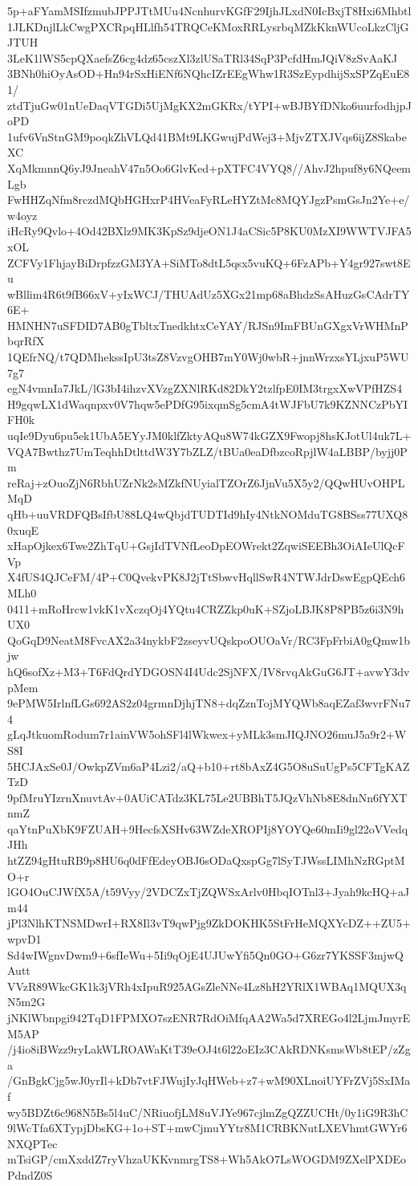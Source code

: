 5p+aFYamMSIfzmubJPPJTtMUu4NcnhurvKGfF29IjhJLxdN0IcBxjT8Hxi6Mhbtl
1JLKDnjlLkCwgPXCRpqHLlfh54TRQCeKMoxRRLysrbqMZkKknWUcoLkzCljGJTUH
3LeK1lWS5cpQXaefsZ6cg4dz65cszXl3zlUSaTRl34SqP3PcfdHmJQiV8zSvAaKJ
3BNh0hiOyAsOD+Hn94rSxHiENf6NQhcIZrEEgWhw1R3SzEypdhijSxSPZqEuE81/
ztdTjuGw01nUeDaqVTGDi5UjMgKX2mGKRx/tYPI+wBJBYfDNko6uurfodhjpJoPD
1ufv6VnStnGM9poqkZhVLQd41BMt9LKGwujPdWej3+MjvZTXJVqs6ijZ8SkabeXC
XqMkmnnQ6yJ9JneahV47n5Oo6GlvKed+pXTFC4VYQ8//AhvJ2hpuf8y6NQeemLgb
FwHHZqNfm8rczdMQbHGHxrP4HVeaFyRLeHYZtMc8MQYJgzPsmGsJn2Ye+e/w4oyz
iHcRy9Qvlo+4Od42BXlz9MK3KpSz9djeON1J4aCSic5P8KU0MzXI9WWTVJFA5xOL
ZCFVy1FhjayBiDrpfzzGM3YA+SiMTo8dtL5qsx5vuKQ+6FzAPb+Y4gr927swt8Eu
wBllim4R6t9fB66xV+yIxWCJ/THUAdUz5XGx21mp68aBhdzSsAHuzGsCAdrTY6E+
HMNHN7uSFDID7AB0gTbltxTnedkhtxCeYAY/RJSn9ImFBUnGXgxVrWHMnPbqrRfX
1QEfrNQ/t7QDMhekssIpU3tsZ8VzvgOHB7mY0Wj0wbR+jnnWrzxsYLjxuP5WU7g7
egN4vmnIa7JkL/lG3bI4ihzvXVzgZXNlRKd82DkY2tzlfpE0IM3trgxXwVPfHZS4
H9gqwLX1dWaqnpxv0V7hqw5ePDfG95ixqmSg5cmA4tWJFbU7k9KZNNCzPbYIFH0k
uqIe9Dyu6pu5ek1UbA5EYyJM0klfZktyAQu8W74kGZX9Fwopj8hsKJotUl4uk7L+
VQA7Bwthz7UmTeqhhDtlttdW3Y7bZLZ/tBUa0eaDfbzcoRpjlW4aLBBP/byjj0Pm
reRaj+zOuoZjN6RbhUZrNk2sMZkfNUyialTZOrZ6JjnVu5X5y2/QQwHUvOHPLMqD
qHb+uuVRDFQBsIfbU88LQ4wQbjdTUDTId9hIy4NtkNOMduTG8BSss77UXQ80xuqE
xHapOjkex6Twe2ZhTqU+GsjIdTVNfLeoDpEOWrekt2ZqwiSEEBh3OiAIeUlQcFVp
X4fUS4QJCeFM/4P+C0QvekvPK8J2jTtSbwvHqllSwR4NTWJdrDswEgpQEch6MLh0
0411+mRoHrcw1vkK1vXczqOj4YQtu4CRZZkp0uK+SZjoLBJK8P8PB5z6i3N9hUX0
QoGqD9NeatM8FvcAX2a34nykbF2zseyvUQskpoOUOaVr/RC3FpFrbiA0gQmw1bjw
hQ6sofXz+M3+T6FdQrdYDGOSN4I4Udc2SjNFX/IV8rvqAkGuG6JT+avwY3dvpMem
9ePMW5IrlnfLGs692AS2z04grmnDjhjTN8+dqZznTojMYQWb8aqEZaf3wvrFNu74
gLqJtkuomRodum7r1ainVW5ohSFl4lWkwex+yMLk3smJIQJNO26muJ5a9r2+WS8I
5HCJAxSe0J/OwkpZVm6aP4Lzi2/aQ+b10+rt8bAxZ4G5O8uSuUgPs5CFTgKAZTzD
9pfMruYIzrnXnuvtAv+0AUiCATdz3KL75Le2UBBhT5JQzVhNb8E8dnNn6fYXTnmZ
qaYtnPuXbK9FZUAH+9HecfsXSHv63WZdeXROPIj8YOYQe60mIi9gl22oVVedqJHh
htZZ94gHtuRB9p8HU6q0dFfEdeyOBJ6sODaQxspGg7lSyTJWssLIMhNzRGptMO+r
lGO4OuCJWfX5A/t59Vyy/2VDCZxTjZQWSxArlv0HbqIOTnl3+Jyah9kcHQ+aJm44
jPl3NlhKTNSMDwrI+RX8Il3vT9qwPjg9ZkDOKHK5StFrHeMQXYcDZ++ZU5+wpvD1
Sd4wIWgnvDwm9+6sfIeWu+5Ii9qOjE4UJUwYfi5Qn0GO+G6zr7YKSSF3mjwQAutt
VVzR89WkcGK1k3jVRh4xIpuR925AGsZleNNe4Lz8hH2YRlX1WBAq1MQUX3qN5m2G
jNKlWbnpgi942TqD1FPMXO7szENR7RdOiMfqAA2Wa5d7XREGo4l2LjmJmyrEM5AP
/j4io8iBWzz9ryLakWLROAWaKtT39eOJ4t6l22oEIz3CAkRDNKsmsWb8tEP/zZga
/GnBgkCjg5wJ0yrIl+kDb7vtFJWujIyJqHWeb+z7+wM90XLnoiUYFrZVj5SxIMaf
wy5BDZt6c968N5Bs5l4uC/NRiuofjLM8uVJYe967cjlmZgQZZUCHt/0y1iG9R3hC
9lWcTfa6XTypjDbsKG+1o+ST+mwCjmuYYtr8M1CRBKNutLXEVhmtGWYr6NXQPTec
mTsiGP/cmXxddZ7ryVhzaUKKvnmrgTS8+Wh5AkO7LsWOGDM9ZXelPXDEoPdndZ0S

